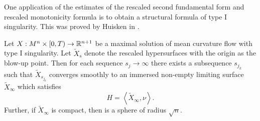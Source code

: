One application of the estimates of the rescaled second fundamental form and rescaled monotonicity formula is to obtain a structural formula of type I singularity. This was proved by Huisken in \cite{huisken1990asymptotic}. \begin{thm}
    Let $ X: M^{n} \times [0, T) \to \mathbb{R}^{n+1}$ be a maximal solution of mean curvature flow with type I singularity. Let $ \tilde{X}_{s} $ denote the rescaled hypersurfaces with the origin as the blow-up point. Then for each sequence $ s_{j} \to \infty $ there exists a subsequence $ s_{j_{k}} $ such that $ \tilde{X}_{s_{j_{k}}} $ converges smoothly to an immersed non-empty limiting surface $ \tilde{X}_{\infty} $ which satisfies 
    \[ H = \left< \tilde{X}_{\infty},\nu \right> .\]
    Further, if $ \tilde{X}_{\infty} $ is compact, then is a sphere of radius $ \sqrt{n} $.
\end{thm}

\begin{comment}
    \section{Surfaces of positive mean curvature}

From the maximum principle, we know that if the mean curvature of the initial hypersurface $M_0$ is positive then it will stay positive on $M_t$. 
For self-similar solutions, we know that the limiting hypersurface will satisfy the equation $H = \langle x, \nu \rangle$. 
We prove that the sphere is the only compact hypersurface of positive mean curvature moving under self-similarity 
\begin{thm}
If $M^n$, $n\ge 2$, is compact with non-negative mean curvature $H$ and satisfies the equation $H = - \langle X, \nu \rangle$, then $M^n$ is a sphere of radius $\sqrt{n}$. 
\end{thm}
\begin{proof}
Suppose the hypersurface satisfies $H = -\langle X, \nu \rangle$. Let $e_1,\ldots, e_n$ be an orthonormal frame on $M^n$, then 
\begin{align}
    \nabla_{i}H & = - \left< D_{e_{i}}X, \nu \right> - \left< X, \nabla_{e_{i}}\nu \right> \nonumber \\
    & = -\left< e_{i}, \nu \right> - \left< X, \left< \nabla_{e_{i}}\nu,e_{l} \right>e_{l} \right>\nonumber \\ 
    & = \left< X,e_{l} \right>h_{il}
\end{align}
\[\nabla_i \nabla_j H = h_{ij} - Hh_{il}h_{lj}+\langle x, e_l \rangle \nabla_l h_{ij}\]
\end{proof}
\end{comment}


